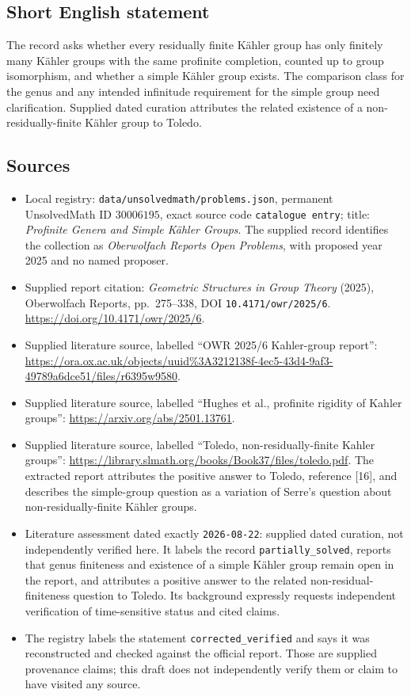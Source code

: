 \documentclass[11pt]{article}
\begin{document}
\subsection{Short English statement}
The record asks whether every residually finite Kähler group has only finitely many Kähler groups with the same profinite completion, counted up to group isomorphism, and whether a simple Kähler group exists. The comparison class for the genus and any intended infinitude requirement for the simple group need clarification. Supplied dated curation attributes the related existence of a non-residually-finite Kähler group to Toledo.
\subsection{Sources}
\begin{itemize}
\item Local registry: \texttt{data/unsolvedmath/problems.json}, permanent UnsolvedMath ID \(30006195\), exact source code \texttt{catalogue entry}; title: \emph{Profinite Genera and Simple Kähler Groups}. The supplied record identifies the collection as \emph{Oberwolfach Reports Open Problems}, with proposed year 2025 and no named proposer.
\item Supplied report citation: \emph{Geometric Structures in Group Theory} (2025), Oberwolfach Reports, pp.\ 275--338, DOI \texttt{10.4171/owr/2025/6}. \url{https://doi.org/10.4171/owr/2025/6}.
\item Supplied literature source, labelled ``OWR 2025/6 Kahler-group report'': \url{https://ora.ox.ac.uk/objects/uuid%3A3212138f-4ec5-43d4-9af3-49789a6dce51/files/r6395w9580}.
\item Supplied literature source, labelled ``Hughes et al., profinite rigidity of Kahler groups'': \url{https://arxiv.org/abs/2501.13761}.
\item Supplied literature source, labelled ``Toledo, non-residually-finite Kahler groups'': \url{https://library.slmath.org/books/Book37/files/toledo.pdf}. The extracted report attributes the positive answer to Toledo, reference [16], and describes the simple-group question as a variation of Serre's question about non-residually-finite Kähler groups.
\item Literature assessment dated exactly \texttt{2026-08-22}: supplied dated curation, not independently verified here. It labels the record \texttt{partially\_solved}, reports that genus finiteness and existence of a simple Kähler group remain open in the report, and attributes a positive answer to the related non-residual-finiteness question to Toledo. Its background expressly requests independent verification of time-sensitive status and cited claims.
\item The registry labels the statement \texttt{corrected\_verified} and says it was reconstructed and checked against the official report. Those are supplied provenance claims; this draft does not independently verify them or claim to have visited any source.
\end{itemize}
\end{document}

